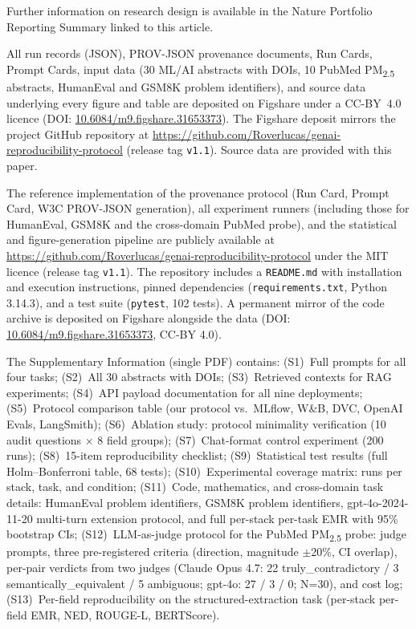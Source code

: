 \documentclass[sn-nature]{sn-jnl}
\begin{document}
Further information on research design is available in the Nature Portfolio Reporting Summary linked to this article.


\backmatter


All run records (JSON), PROV-JSON provenance documents, Run Cards, Prompt Cards, input data (30 ML/AI abstracts with DOIs, 10 PubMed PM\textsubscript{2.5} abstracts, HumanEval and GSM8K problem identifiers), and source data underlying every figure and table are deposited on Figshare under a CC-BY~4.0 licence (DOI: \href{https://doi.org/10.6084/m9.figshare.31653373}{10.6084/m9.figshare.31653373}). The Figshare deposit mirrors the project GitHub repository at \url{https://github.com/Roverlucas/genai-reproducibility-protocol} (release tag \texttt{v1.1}). Source data are provided with this paper.


The reference implementation of the provenance protocol (Run Card, Prompt Card, W3C PROV-JSON generation), all experiment runners (including those for HumanEval, GSM8K and the cross-domain PubMed probe), and the statistical and figure-generation pipeline are publicly available at \url{https://github.com/Roverlucas/genai-reproducibility-protocol} under the MIT licence (release tag \texttt{v1.1}). The repository includes a \texttt{README.md} with installation and execution instructions, pinned dependencies (\texttt{requirements.txt}, Python 3.14.3), and a test suite (\texttt{pytest}, 102 tests). A permanent mirror of the code archive is deposited on Figshare alongside the data (DOI: \href{https://doi.org/10.6084/m9.figshare.31653373}{10.6084/m9.figshare.31653373}, CC-BY 4.0).


The Supplementary Information (single PDF) contains:
(S1)~Full prompts for all four tasks;
(S2)~All 30 abstracts with DOIs;
(S3)~Retrieved contexts for RAG experiments;
(S4)~API payload documentation for all nine deployments;
(S5)~Protocol comparison table (our protocol vs.\ MLflow, W\&B, DVC, OpenAI Evals, LangSmith);
(S6)~Ablation study: protocol minimality verification (10 audit questions $\times$ 8 field groups);
(S7)~Chat-format control experiment (200 runs);
(S8)~15-item reproducibility checklist;
(S9)~Statistical test results (full Holm--Bonferroni table, 68 tests);
(S10)~Experimental coverage matrix: runs per stack, task, and condition;
(S11)~Code, mathematics, and cross-domain task details: HumanEval problem identifiers, GSM8K problem identifiers, gpt-4o-2024-11-20 multi-turn extension protocol, and full per-stack per-task EMR with 95\% bootstrap CIs;
(S12)~LLM-as-judge protocol for the PubMed PM\textsubscript{2.5} probe: judge prompts, three pre-registered criteria (direction, magnitude $\pm$20\%, CI overlap), per-pair verdicts from two judges (Claude Opus 4.7: 22 truly\_contradictory / 3 semantically\_equivalent / 5 ambiguous; gpt-4o: 27 / 3 / 0; N=30), and cost log;
(S13)~Per-field reproducibility on the structured-extraction task (per-stack per-field EMR, NED, ROUGE-L, BERTScore).
\end{document}
